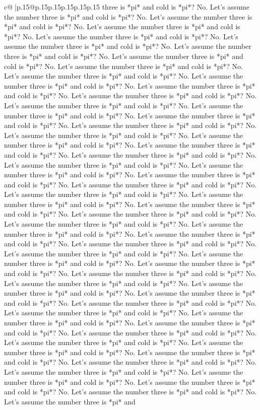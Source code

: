 \documentclass{article}
\begin{document}
{\begin{supertabular}{c@{$\;$}|p{.15\linewidth}@{}p{.15\linewidth}p{.15\linewidth}p{.15\linewidth}p{.15\linewidth}p{.15\linewidth}}
{{{three is *pi* and cold is *pi*? No. Let's assume the number three is *pi* and cold is *pi*? No. Let's assume the number three is *pi* and cold is *pi*? No. Let's assume the number three is *pi* and cold is *pi*? No. Let's assume the number three is *pi* and cold is *pi*? No. Let's assume the number three is *pi* and cold is *pi*? No. Let's assume the number three is *pi* and cold is *pi*? No. Let's assume the number three is *pi* and cold is *pi*? No. Let's assume the number three is *pi* and cold is *pi*? No. Let's assume the number three is *pi* and cold is *pi*? No. Let's assume the number three is *pi* and cold is *pi*? No. Let's assume the number three is *pi* and cold is *pi*? No. Let's assume the number three is *pi* and cold is *pi*? No. Let's assume the number three is *pi* and cold is *pi*? No. Let's assume the number three is *pi* and cold is *pi*? No. Let's assume the number three is *pi* and cold is *pi*? No. Let's assume the number three is *pi* and cold is *pi*? No. Let's assume the number three is *pi* and cold is *pi*? No. Let's assume the number three is *pi* and cold is *pi*? No. Let's assume the number three is *pi* and cold is *pi*? No. Let's assume the number three is *pi* and cold is *pi*? No. Let's assume the number three is *pi* and cold is *pi*? No. Let's assume the number three is *pi* and cold is *pi*? No. Let's assume the number three is *pi* and cold is *pi*? No. Let's assume the number three is *pi* and cold is *pi*? No. Let's assume the number three is *pi* and cold is *pi*? No. Let's assume the number three is *pi* and cold is *pi*? No. Let's assume the number three is *pi* and cold is *pi*? No. Let's assume the number three is *pi* and cold is *pi*? No. Let's assume the number three is *pi* and cold is *pi*? No. Let's assume the number three is *pi* and cold is *pi*? No. Let's assume the number three is *pi* and cold is *pi*? No. Let's assume the number three is *pi* and cold is *pi*? No. Let's assume the number three is *pi* and cold is *pi*? No. Let's assume the number three is *pi* and cold is *pi*? No. Let's assume the number three is *pi* and cold is *pi*? No. Let's assume the number three is *pi* and cold is *pi*? No. Let's assume the number three is *pi* and cold is *pi*? No. Let's assume the number three is *pi* and cold is *pi*? No. Let's assume the number three is *pi* and cold is *pi*? No. Let's assume the number three is *pi* and cold is *pi*? No. Let's assume the number three is *pi* and cold is *pi*? No. Let's assume the number three is *pi* and cold is *pi*? No. Let's assume the number three is *pi* and cold is *pi*? No. Let's assume the number three is *pi* and cold is *pi*? No. Let's assume the number three is *pi* and cold is *pi*? No. Let's assume the number three is *pi* and cold is *pi*? No. Let's assume the number three is *pi* and cold is *pi*? No. Let's assume the number three is *pi* and cold is *pi*? No. Let's assume the number three is *pi* and cold is *pi*? No. Let's assume the number three is *pi* and cold is *pi*? No. Let's assume the number three is *pi* and cold is *pi*? No. Let's assume the number three is *pi* and cold is *pi*? No. Let's assume the number three is *pi* and }}}
\end{supertabular}}
\end{document}

